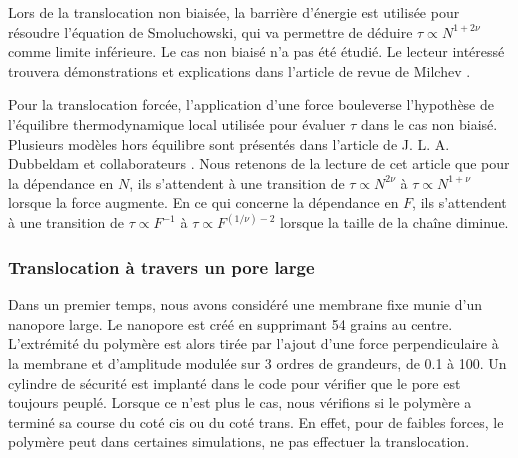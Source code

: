 \documentclass[a4paper,11pt]{article}
\begin{document}
 Lors de la translocation non biaisée, la barrière d'énergie est utilisée pour résoudre l'équation de Smoluchowski, qui va permettre de déduire $\tau \propto N^{1+2\nu}$ comme limite inférieure. Le cas non biaisé n'a pas été étudié. Le lecteur intéressé trouvera démonstrations et explications dans l'article de revue de Milchev \cite{milchev}.
 
 Pour la translocation forcée, l'application d'une force bouleverse l'hypothèse de l'équilibre thermodynamique local utilisée pour évaluer $\tau$ dans le cas non biaisé. Plusieurs modèles hors équilibre sont présentés dans l'article de J. L. A. Dubbeldam et collaborateurs \cite{traction}. Nous retenons de la lecture de cet article que pour la dépendance en $N$, ils s'attendent à une transition de $\tau \propto N^{2\nu}$ à $\tau \propto N^{1+\nu}$ lorsque la force augmente. En ce qui concerne la dépendance en $F$, ils s'attendent à une transition de $\tau \propto F^{-1}$ à $\tau \propto F^{(1/\nu)-2}$ lorsque la taille de la chaîne diminue.



\subsubsection*{Translocation à travers un pore large}

Dans un premier temps, nous avons considéré une membrane fixe munie d'un nanopore large. Le nanopore est créé en supprimant 54 grains au centre. L'extrémité du polymère est alors tirée par l'ajout d'une force perpendiculaire à la membrane et d'amplitude modulée sur 3 ordres de grandeurs, de 0.1 à 100. Un cylindre de sécurité est implanté dans le code pour vérifier que le pore est toujours peuplé. Lorsque ce n'est plus le cas, nous vérifions si le polymère a terminé sa course du coté cis ou du coté trans. En effet, pour de faibles forces, le polymère peut dans certaines simulations, ne pas effectuer la translocation.\\
\end{document}
